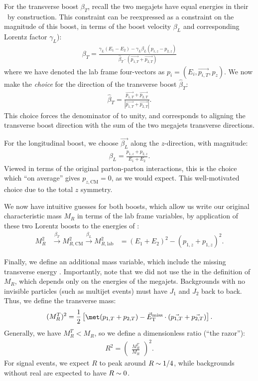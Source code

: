 For the transverse boost $\beta_T$, recall the two megajets have equal energies in their \rframe~by construction.
This constraint can be reexpressed as a constraint on the magnitude of this boost, in terms of the boost velocity $\beta_L$ and corresponding Lorentz factor $\gamma_L$):
\begin{align}\label{eq:beta_t}
\beta_T = \frac{ \gamma_L (E_1 - E_2) - \gamma_L \beta_L (p_{1,z} - p_{2,z})}
               { \hat{\beta}_T \cdot (\vec{p_{1,T}} + \vec{p_{2,T}} )}
\end{align}
where we have denoted the lab frame four-vectors as  $p_i = (E_i , \vec{p_{i,T}} , p_z)$.
We now make the \textit{choice} for the direction of the transverse boost $\hat{\beta}_T$:
\begin{align}
\hat{\beta}_T =  \frac{\vec{p_{1,T}} +  \vec{p_{2,T}}}{ | \vec{p_{1,T}} +  \vec{p_{2,T}}  | }.
\end{align}
This choice forces the denominator of  to unity, and corresponds to aligning the transverse boost direction with the sum of the two megajets transverse directions.

For the longitudinal boost, we choose $\vec{\beta_L}$ along the $z$-direction, with magnitude:
\begin{align} \label{eq:beta_l}
\beta_L = \frac{p_{1,z} + p_{2,z}}{E_1+E_2}.
\end{align}
Viewed in terms of the original parton-parton interactions, this is the choice which ``on average'' gives $p_{z,\text{CM}} = 0$, as we would expect.
This well-motivated choice due to the total $z$ symmetry.

We now have intuitive guesses for both boosts, which allow us write our original characteristic mass $M_R$ in terms of the lab frame variables, by application of these two Lorentz boosts to the energies of :
\begin{align}
M_R^2 &\xrightarrow[]{\beta_T } M_{R,\text{CM}}^{2} \xrightarrow[]{\beta_L } M_{R,\text{lab}}^{2}
      &=(E_1 + E_2)^2 - (p_{1,z} + p_{1,z})^2.
\end{align}

Finally, we define an additional mass variable, which include the missing transverse energy \met.
Importantly, note that we did not use the \met in the definition of $M_R$, which depends only on the energies of the megajets.
Backgrounds with no invisible particles (such as multijet events) must have $J_1$ and $J_2$ back to back.
Thus, we define the transverse mass:
\begin{align}
(M_R^T)^2 = \frac{1}{2} \begin{bmatrix} \met(p_{1,T}  + p_{2,T}) - \metvec \cdot (\vec{p_{1,T}}  + \vec{p_{2,T} })  \end{bmatrix}.
\end{align}
Generally, we have $M_R^T < M_R$, so we define a dimensionless ratio (``the razor''):
\begin{align}
R^2 = \begin{pmatrix} \frac{M_R^T}{M_R} \end{pmatrix}^2.
\end{align}
For signal events, we expect $R$ to peak around $R \sim 1/4$, while backgrounds without real \met are expected to have $R \sim 0$.

